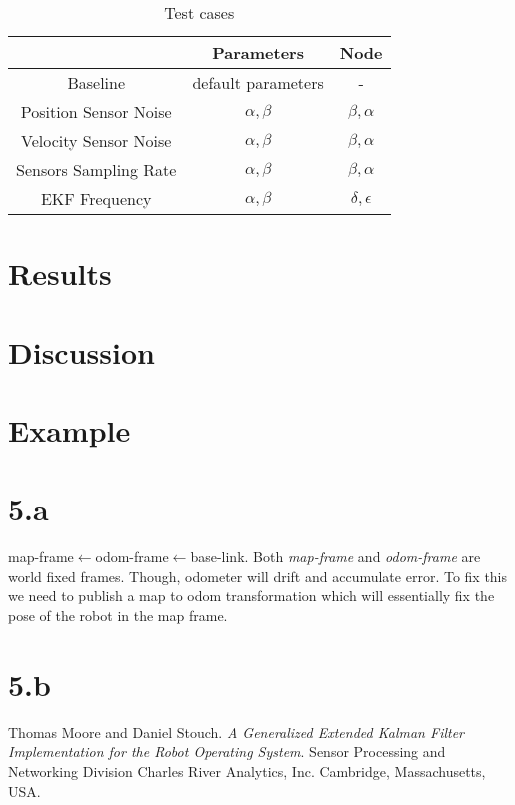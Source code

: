\documentclass[10pt,a4paper,twocolumn]{article}
\begin{document}
\begin{table}[h!]
	\centering
	\begin{tabular}{|c c c|} 
		\hline
		& Parameters & Node  \\ [0.5ex] 
		\hline\hline
		Baseline & default parameters  & -  \\
		Position Sensor Noise & $\alpha,\beta$  & $\beta,\alpha$  \\
		Velocity Sensor Noise & $\alpha,\beta$  & $\beta,\alpha$  \\
		Sensors Sampling Rate & $\alpha,\beta$  & $\beta,\alpha$  \\
		EKF Frequency & $\alpha,\beta$ & $\delta,\epsilon$  \\ [1ex] 
		\hline
	\end{tabular}
	\caption{Test cases \label{overflow}}
\end{table}
	
\section{Results}

\section{Discussion}

\section{Example}


\section{5.a}
map-frame$\leftarrow$odom-frame$\leftarrow$base-link. Both \textit{map-frame} and \textit{odom-frame} are world fixed frames. Though, odometer will drift and accumulate error. To fix this we need to publish a map to odom transformation which will essentially fix the pose of the robot in the map frame.

\section{5.b}

\begin{thebibliography}{9}
	Thomas Moore and Daniel Stouch. 
	\textit{A Generalized Extended Kalman Filter Implementation for the Robot Operating System}. 
	Sensor Processing and Networking Division Charles River Analytics, Inc. Cambridge, Massachusetts, USA.	
	
\end{thebibliography}


	
\end{document}
